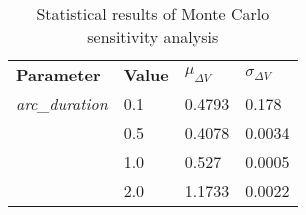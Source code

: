 
                \begin{table}[]
                \centering
                \begin{tabular}{l l l l}
                \rowcolor[HTML]{EFEFEF} \textbf{Parameter} & \textbf{Value} & \textbf{$\mu_{\Delta V}$} & \textbf{$\sigma_{\Delta V}$} \\
                \textit{arc\_duration} & 0.1 & 0.4793 & 0.178 \\
 & 0.5 & 0.4078 & 0.0034 \\
 & 1.0 & 0.527 & 0.0005 \\
 & 2.0 & 1.1733 & 0.0022 \\

                \end{tabular}
                \caption{Statistical results of Monte Carlo sensitivity analysis}
                \label{tab:SensitivityAnalysis}
                \end{table}
                